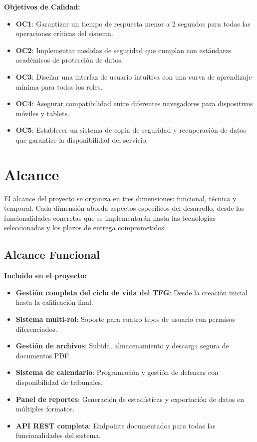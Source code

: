 \documentclass[12pt,a4paper,oneside]{report}
\providecommand{\tightlist}{%
  \setlength{\itemsep}{0pt}\setlength{\parskip}{0pt}}
\begin{document}
\textbf{Objetivos de Calidad:}

\begin{itemize}
\tightlist
\item
  \textbf{OC1}: Garantizar un tiempo de respuesta menor a 2 segundos
  para todas las operaciones críticas del sistema.
\item
  \textbf{OC2}: Implementar medidas de seguridad que cumplan con
  estándares académicos de protección de datos.
\item
  \textbf{OC3}: Diseñar una interfaz de usuario intuitiva con una curva
  de aprendizaje mínima para todos los roles.
\item
  \textbf{OC4}: Asegurar compatibilidad entre diferentes navegadores para dispositivos móviles y tablets.
\item
  \textbf{OC5}: Establecer un sistema de copia de seguridad y recuperación de datos
  que garantice la disponibilidad del servicio.
\end{itemize}

\section{Alcance}\label{alcance}

El alcance del proyecto se organiza en tres dimensiones: funcional, técnica y temporal. Cada dimensión aborda aspectos específicos del desarrollo, desde las funcionalidades concretas que se implementarán hasta las tecnologías seleccionadas y los plazos de entrega comprometidos.

\subsection{Alcance Funcional}\label{alcance-funcional}

\textbf{Incluido en el proyecto:}

\begin{itemize}
\tightlist
\item
  \textbf{Gestión completa del ciclo de vida del TFG}: Desde la creación
  inicial hasta la calificación final.
\item
  \textbf{Sistema multi-rol}: Soporte para cuatro tipos de usuario con
  permisos diferenciados.
\item
  \textbf{Gestión de archivos}: Subida, almacenamiento y descarga segura
  de documentos PDF.
\item
  \textbf{Sistema de calendario}: Programación y gestión de defensas con
  disponibilidad de tribunales.
\item
  \textbf{Panel de reportes}: Generación de estadísticas y exportación
  de datos en múltiples formatos.
\item
  \textbf{API REST completa}: Endpoints documentados para todas las
  funcionalidades del sistema.
\end{itemize}
\end{document}
